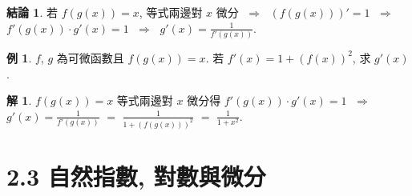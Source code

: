 \documentclass[12pt]{extarticle}
\newcommand{\ds}{\displaystyle}
\newcommand{\ie}{\;\Longrightarrow\;}
\theoremstyle{definition}
\newtheorem*{fact}{結論}
\newtheorem*{ex}{例}
\newtheorem*{sol}{解}
\begin{document}
\begin{fact}
  若 $f(g(x)) = x$, 等式兩邊對 $x$ 微分 $\ie$ $\ds(f(g(x)))' = 1$ $\ie$ $\ds f'(g(x))\cdot g'(x) = 1$ $\ie$ $\ds g'(x) = \frac{1}{f'(g(x))}$.   
\end{fact}

\begin{ex}
  $f$, $g$ 為可微函數且 $\ds f(g(x)) = x$. 若 $\ds f'(x) = 1 + (f(x))^2$, 求 $g'(x)$.   
\end{ex}

\begin{sol}
  $\ds f(g(x)) = x$ 等式兩邊對 $x$ 微分得 $\ds f'(g(x))\cdot g'(x) = 1$ $\ie$ $\ds g'(x) = \frac{1}{f'(g(x))}$ $=$ $\ds\frac{1}{1 + (f(g(x)))^2}$ $=$ $\ds\frac{1}{1 + x^2}$. 
\end{sol}

%

\section*{2.3 自然指數, 對數與微分}
\end{document}
